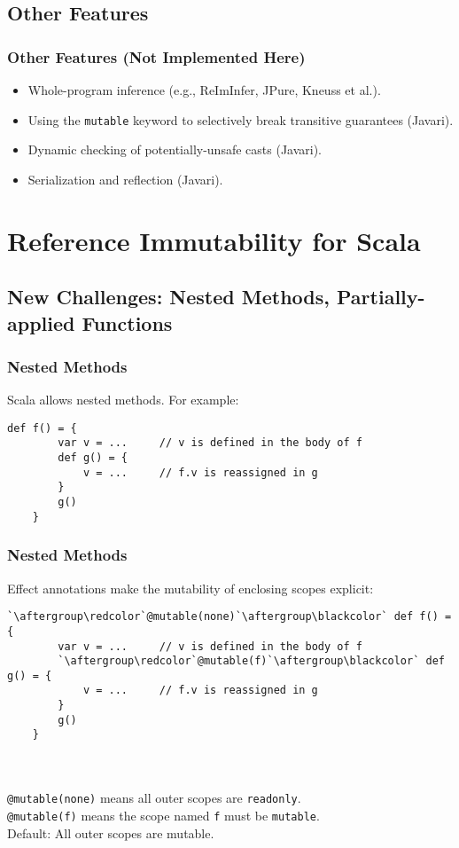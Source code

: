 \documentclass{beamer}
\newcommand{\code}[1]{\lstinline$#1$}
\begin{document}
	\subsection{Other Features}
\begin{frame}[containsverbatim]   %
\frametitle{Other Features (Not Implemented Here)}
\begin{itemize}
\item Whole-program inference (e.g., ReImInfer, JPure, Kneuss et al.).
\item Using the \code{mutable} keyword to selectively break transitive guarantees (Javari).
\item Dynamic checking of potentially-unsafe casts (Javari).
\item Serialization and reflection (Javari).
\end{itemize}
\end{frame}


\section{Reference Immutability for Scala}

	\subsection{New Challenges: Nested Methods, Partially-applied Functions}

\begin{frame}[containsverbatim]
\frametitle{Nested Methods}
Scala allows nested methods. For example:
\begin{lstlisting}[escapechar=`]
	def f() = {
		var v = ...     // v is defined in the body of f
		def g() = {
			v = ...     // f.v is reassigned in g
		}
		g()
	}
\end{lstlisting}
\end{frame}

\begin{frame}[containsverbatim]
\frametitle{Nested Methods}
Effect annotations make the mutability of enclosing scopes explicit:
\begin{lstlisting}[escapechar=`]
	`\aftergroup\redcolor`@mutable(none)`\aftergroup\blackcolor` def f() = {
		var v = ...     // v is defined in the body of f
		`\aftergroup\redcolor`@mutable(f)`\aftergroup\blackcolor` def g() = {
			v = ...     // f.v is reassigned in g
		}
		g()
	}
\end{lstlisting}
\hfill\\
\hfill\\
\redcolor \code{@mutable(none)} \blackcolor means all outer scopes are \code{readonly}.\\
\redcolor \code{@mutable(f)} \blackcolor means the scope named \code{f} must be \code{mutable}.\\
Default: All outer scopes are mutable.
\end{frame}
\end{document}
